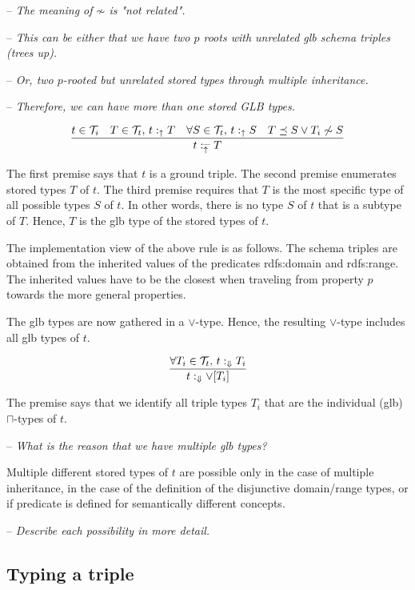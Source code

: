 \documentclass[runningheads]{llncs}
\newcommand{\uarr}{\uparrow}
\newcommand{\Darr}{\Downarrow}
\newcommand{\T}{{\cal T}}
\newcommand{\notes}[1]{\noindent\begin{small}-- \emph{#1}\\\end{small}}
\begin{document}
\notes{The meaning of $\not\sim$ is "\emph{not related}".}
\notes{This can be either that we have two $p$ roots with unrelated glb schema triples (trees up).}
\notes{Or, two $p$-rooted but unrelated stored types through multiple inheritance.}
\notes{Therefore, we can have more than one stored GLB types.}

\begin{equation}
\dfrac{t\in\T_i\quad T\in\T_t,\, t:_\uarr\/T\quad \forall\/S\in\T_t,\, t:_\uarr\/S\quad T\preceq\/S\lor\/T_i\not\sim\/S}
      {t:_\uarr^\_\/T}
\end{equation}

The first premise says that $t$ is a ground triple. The second premise
enumerates stored types $T$ of $t$. The third premise requires that
$T$ is the most specific type of all possible types $S$ of $t$. In
other words, there is no type $S$ of $t$ that is a subtype of
$T$. Hence, $T$ is the glb type of the stored types of $t$.

The implementation view of the above rule is as follows. The schema
triples are obtained from the inherited values of the predicates
rdfs:domain and rdfs:range. The inherited values have to be the
closest when traveling from property $p$ towards the more general
properties.

The glb types are now gathered in a $\lor$-type. Hence, the resulting
$\lor$-type includes all glb types of $t$.

\begin{equation}
\dfrac{\forall\/T_i\in\T_t,\, t:_\Darr\/T_i}
      {t:_\Darr\lor[T_i]}
\end{equation}

The premise says that we identify all triple types $T_i$ that
are the individual (glb) $\sqcap$-types of $t$. 

\medskip
\notes{What is the reason that we have multiple glb types?}

Multiple different stored types of $t$ are possible only in
the case of multiple inheritance, in the case of the definition of the
disjunctive domain/range types, or if predicate is defined for
semantically different concepts.

\notes{Describe each possibility in more detail.}





\subsection{Typing a triple}
\end{document}
